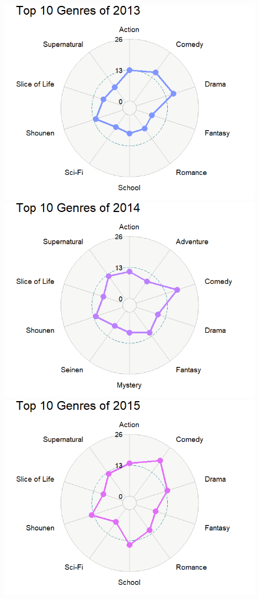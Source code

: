 \documentclass[a4paper]{article}
\begin{document}
	\begin{figure}[!htb]
		\includegraphics[width=\linewidth]{2013Radar.png}
		\endminipage\hfill
		\includegraphics[width=\linewidth]{2014Radar.png}
		\endminipage\hfill
		\includegraphics[width=\linewidth]{2015Radar.png}
		\endminipage
	\end{figure}
\end{document}
